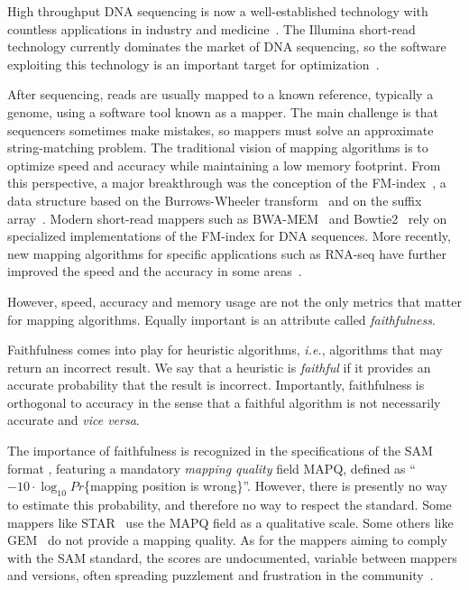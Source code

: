 \documentclass[a4,center,fleqn]{NAR}
\begin{document}
High throughput DNA sequencing is now a well-established technology with
countless applications in industry and medicine~\cite{pmid30084865}. The
Illumina short-read technology currently dominates the market of DNA
sequencing, so the software exploiting this technology is an important
target for optimization~\cite{Wikillu}.

After sequencing, reads are usually mapped to a known reference, typically
a genome, using a software tool known as a mapper. The main challenge is
that sequencers sometimes make mistakes, so mappers must solve an
approximate string-matching problem. The traditional vision of mapping
algorithms is to optimize speed and accuracy while maintaining a low
memory footprint. From this perspective, a major breakthrough was the
conception of the FM-index~\cite{ferragina2000opportunistic,
ferragina2005indexing}, a data structure based on the Burrows-Wheeler
transform~\cite{burrows1994block} and on the suffix
array~\cite{manber1993suffix}. Modern short-read mappers such as
BWA-MEM~\cite{li2013aligning} and Bowtie2~\cite{pmid22388286} rely on
specialized implementations of the FM-index for DNA sequences. More
recently, new mapping algorithms for specific applications such as RNA-seq
have further improved the speed and the accuracy in some
areas~\cite{pmid27043002}.

However, speed, accuracy and memory usage are not the only metrics that
matter for mapping algorithms. Equally important is an attribute called
\emph{faithfulness}.

Faithfulness comes into play for heuristic algorithms, \textit{i.e.},
algorithms that may return an incorrect result. We say that a heuristic is
\emph{faithful} if it provides an accurate probability that the result is
incorrect. Importantly, faithfulness is orthogonal to accuracy in the
sense that a faithful algorithm is not necessarily accurate and
\textit{vice versa}.

\enlargethispage{-65.1pt}

The importance of faithfulness is recognized in the specifications of the
SAM format \cite{pmid19505943}, featuring a mandatory \emph{mapping
quality} field MAPQ, defined as ``$-10 \cdot \log_{10}Pr$\{mapping
position is wrong\}''. However, there is presently no way to estimate this
probability, and therefore no way to respect the standard. Some mappers
like STAR~\cite{pmid23104886} use the MAPQ field as a qualitative scale.
Some others like GEM~\cite{pmid23103880} do not provide a mapping quality.
As for the mappers aiming to comply with the SAM standard, the scores are
undocumented, variable between mappers and versions, often spreading
puzzlement and frustration in the community~\cite{ACGT, QCFail}.
\end{document}
